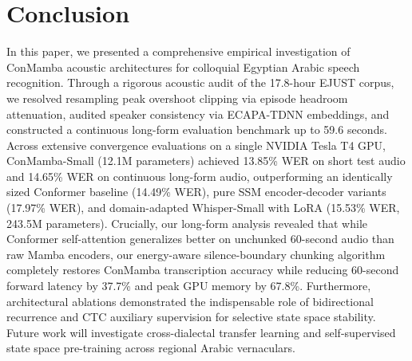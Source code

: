 \documentclass[journal]{IEEEtran}
\begin{document}
\section{Conclusion}
\label{sec:conclusion}
In this paper, we presented a comprehensive empirical investigation of ConMamba acoustic architectures for colloquial Egyptian Arabic speech recognition. Through a rigorous acoustic audit of the 17.8-hour EJUST corpus, we resolved resampling peak overshoot clipping via episode headroom attenuation, audited speaker consistency via ECAPA-TDNN embeddings, and constructed a continuous long-form evaluation benchmark up to 59.6 seconds. Across extensive convergence evaluations on a single NVIDIA Tesla T4 GPU, ConMamba-Small (12.1M parameters) achieved 13.85\% WER on short test audio and 14.65\% WER on continuous long-form audio, outperforming an identically sized Conformer baseline (14.49\% WER), pure SSM encoder-decoder variants (17.97\% WER), and domain-adapted Whisper-Small with LoRA (15.53\% WER, 243.5M parameters). Crucially, our long-form analysis revealed that while Conformer self-attention generalizes better on unchunked 60-second audio than raw Mamba encoders, our energy-aware silence-boundary chunking algorithm completely restores ConMamba transcription accuracy while reducing 60-second forward latency by 37.7\% and peak GPU memory by 67.8\%. Furthermore, architectural ablations demonstrated the indispensable role of bidirectional recurrence and CTC auxiliary supervision for selective state space stability. Future work will investigate cross-dialectal transfer learning and self-supervised state space pre-training across regional Arabic vernaculars.
\end{document}
